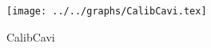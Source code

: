 \begin{figure}[h] \centering \texttt{[image: ../../graphs/CalibCavi.tex]}\caption{CalibCavi}\label{gr:CalibCavi} \end{figure}
